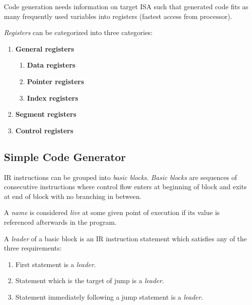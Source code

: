 \begin{remark}
    Code generation needs information on target ISA such that generated code fits as many frequently used variables into registers (fastest access from processor).
\end{remark}

\begin{definition}[Registers]
    \textit{Registers} can be categorized into three categories:
    \begin{enumerate}
        \item \textbf{General registers}
        \begin{enumerate}
            \item \textbf{Data registers}
            \item \textbf{Pointer registers}
            \item \textbf{Index registers}
        \end{enumerate}
        \item \textbf{Segment registers}
        \item \textbf{Control registers}
    \end{enumerate}
\end{definition}

\subsection{Simple Code Generator}

\begin{definition}
    IR instructions can be grouped into \textit{basic blocks}. \textit{Basic blocks} are sequences of consecutive instructions where control flow enters at beginning of block and exits at end of block with no branching in between.
    
    A \textit{name} is considered \textit{live} at some given point of execution if its value is referenced afterwards in the program.
\end{definition}

\begin{definition}
    A \textit{leader} of a basic block is an IR instruction statement which satisfies any of the three requirements:
    \begin{enumerate}
        \item First statement is a \textit{leader}.
        \item Statement which is the target of jump is a \textit{leader}.
        \item Statement immediately following a jump statement is a \textit{leader}.
    \end{enumerate}
\end{definition}

